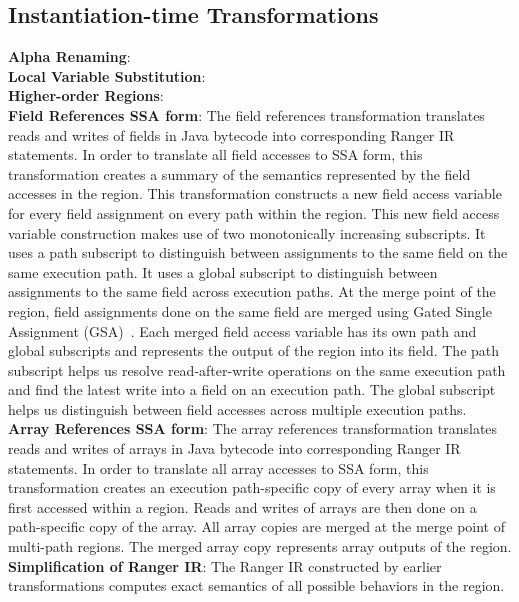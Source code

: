 \subsection{Instantiation-time Transformations}
\textbf{Alpha Renaming}: \\
\textbf{Local Variable Substitution}: \\
\textbf{Higher-order Regions}: \\
\textbf{Field References SSA form}: The field references transformation translates reads and writes of fields
in Java bytecode into corresponding Ranger IR statements.
%
In order to translate all field accesses to SSA form, this transformation creates a summary of the semantics
represented by the field accesses in the region.
%
This transformation constructs a new field access variable for every field assignment on every path within the region.
%
This new field access variable construction makes use of two monotonically increasing subscripts.
%
It uses a path subscript to distinguish between assignments to the same field on the same execution path.
%
It uses a global subscript to distinguish between assignments to the same field across execution paths.
%
At the merge point of the region, field assignments done on the same field are merged using
Gated Single Assignment (GSA)~\cite{Ottenstein1990}.
%
Each merged field access variable has its own path and global subscripts and represents the output of the region into
its field.
%
The path subscript helps us resolve read-after-write operations on the same execution path and find the latest write
into a field on an execution path.
%
The global subscript helps us distinguish between field accesses across multiple execution paths. \\
\textbf{Array References SSA form}: The array references transformation translates reads and writes of arrays in
Java bytecode into corresponding Ranger IR statements.
%
In order to translate all array accesses to SSA form, this transformation creates an execution path-specific copy of
every array when it is first accessed within a region.
%
Reads and writes of arrays are then done on a path-specific copy of the array.
%
All array copies are merged at the merge point of multi-path regions.
%
The merged array copy represents array outputs of the region.\\
\textbf{Simplification of Ranger IR}: The Ranger IR constructed by earlier transformations computes exact semantics
of all possible behaviors in the region.
